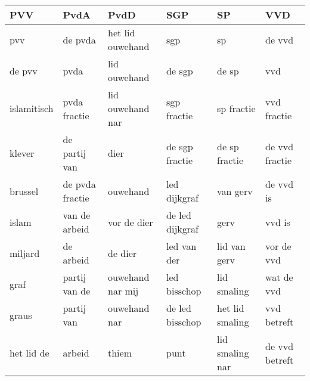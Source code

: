 \begin{tabular}{llllll}
\toprule
         PVV &             PvdA &              PvdD &              SGP &               SP &             VVD \\
\midrule
         pvv &          de pvda &  het lid ouwehand &              sgp &               sp &          de vvd \\
      de pvv &             pvda &      lid ouwehand &           de sgp &            de sp &             vvd \\
 islamitisch &     pvda fractie &  lid ouwehand nar &      sgp fractie &       sp fractie &     vvd fractie \\
      klever &    de partij van &              dier &   de sgp fractie &    de sp fractie &  de vvd fractie \\
     brussel &  de pvda fractie &          ouwehand &     led dijkgraf &         van gerv &       de vvd is \\
       islam &    van de arbeid &       vor de dier &  de led dijkgraf &             gerv &          vvd is \\
     miljard &        de arbeid &           de dier &      led van der &     lid van gerv &      vor de vvd \\
        graf &    partij van de &  ouwehand nar mij &     led bisschop &      lid smaling &      wat de vvd \\
       graus &       partij van &      ouwehand nar &  de led bisschop &  het lid smaling &     vvd betreft \\
  het lid de &           arbeid &             thiem &             punt &  lid smaling nar &  de vvd betreft \\
\bottomrule
\end{tabular}
